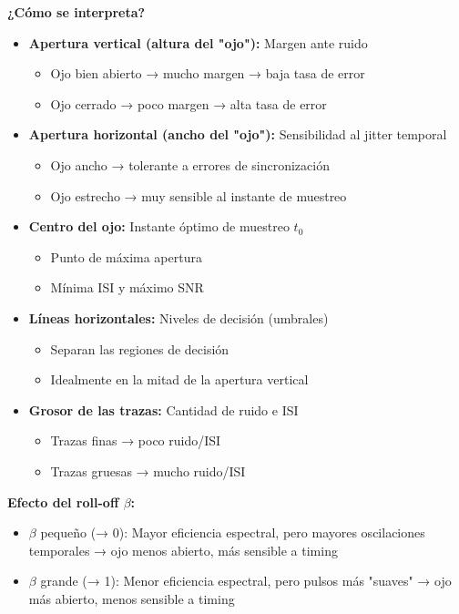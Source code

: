 \documentclass[10pt,a4paper]{article}
\begin{document}
\textbf{¿Cómo se interpreta?}
\begin{itemize}
\item \textbf{Apertura vertical (altura del "ojo"):} Margen ante ruido
  \begin{itemize}
  \item Ojo bien abierto → mucho margen → baja tasa de error
  \item Ojo cerrado → poco margen → alta tasa de error
  \end{itemize}

\item \textbf{Apertura horizontal (ancho del "ojo"):} Sensibilidad al jitter temporal
  \begin{itemize}
  \item Ojo ancho → tolerante a errores de sincronización
  \item Ojo estrecho → muy sensible al instante de muestreo
  \end{itemize}

\item \textbf{Centro del ojo:} Instante óptimo de muestreo $t_0$
  \begin{itemize}
  \item Punto de máxima apertura
  \item Mínima ISI y máximo SNR
  \end{itemize}

\item \textbf{Líneas horizontales:} Niveles de decisión (umbrales)
  \begin{itemize}
  \item Separan las regiones de decisión
  \item Idealmente en la mitad de la apertura vertical
  \end{itemize}

\item \textbf{Grosor de las trazas:} Cantidad de ruido e ISI
  \begin{itemize}
  \item Trazas finas → poco ruido/ISI
  \item Trazas gruesas → mucho ruido/ISI
  \end{itemize}
\end{itemize}

\textbf{Efecto del roll-off $\beta$:}
\begin{itemize}
\item $\beta$ pequeño (→ 0): Mayor eficiencia espectral, pero mayores oscilaciones temporales → ojo menos abierto, más sensible a timing
\item $\beta$ grande (→ 1): Menor eficiencia espectral, pero pulsos más "suaves" → ojo más abierto, menos sensible a timing
\end{itemize}
\end{document}
